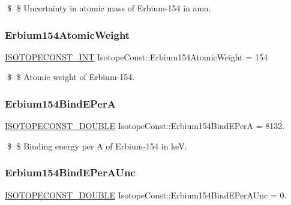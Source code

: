 \$ \$ Uncertainty in atomic mass of Erbium-\/154 in amu. \mbox{\label{group___isotope_const-_erbium-_er154_gaf203cd8688c4ca77d1c36f9d85d41e76}} 
\subsubsection{\texorpdfstring{Erbium154\+Atomic\+Weight}{Erbium154AtomicWeight}}
{\footnotesize\ttfamily \mbox{\hyperlink{group___isotope_const-_macros_ga5f18360b3e99483a35c32d789e62621c}{I\+S\+O\+T\+O\+P\+E\+C\+O\+N\+S\+T\+\_\+\+I\+NT}} Isotope\+Const\+::\+Erbium154\+Atomic\+Weight = 154}

\$ \$ Atomic weight of Erbium-\/154. \mbox{\label{group___isotope_const-_erbium-_er154_gaecaa7b603cf16eaa7a7270549569c843}} 
\subsubsection{\texorpdfstring{Erbium154\+Bind\+E\+PerA}{Erbium154BindEPerA}}
{\footnotesize\ttfamily \mbox{\hyperlink{group___isotope_const-_macros_ga8f45a7272ce02c0b4c65c44636ed719a}{I\+S\+O\+T\+O\+P\+E\+C\+O\+N\+S\+T\+\_\+\+D\+O\+U\+B\+LE}} Isotope\+Const\+::\+Erbium154\+Bind\+E\+PerA = 8132.}

\$ \$ Binding energy per A of Erbium-\/154 in keV. \mbox{\label{group___isotope_const-_erbium-_er154_ga813a4a8d654913cda71b046e3568ba40}} 
\subsubsection{\texorpdfstring{Erbium154\+Bind\+E\+Per\+A\+Unc}{Erbium154BindEPerAUnc}}
{\footnotesize\ttfamily \mbox{\hyperlink{group___isotope_const-_macros_ga8f45a7272ce02c0b4c65c44636ed719a}{I\+S\+O\+T\+O\+P\+E\+C\+O\+N\+S\+T\+\_\+\+D\+O\+U\+B\+LE}} Isotope\+Const\+::\+Erbium154\+Bind\+E\+Per\+A\+Unc = 0.}

